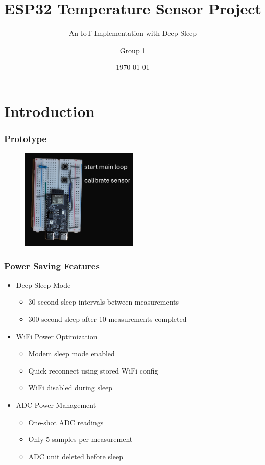 \documentclass[11pt,t,usepdftitle=false,aspectratio=169]{beamer}
\title[Temperature Sensor]{ESP32 Temperature Sensor Project}
\subtitle{An IoT Implementation with Deep Sleep}
\author{Group 1}
\date{\today}
\begin{document}
\section{Introduction}

\begin{frame}
\frametitle{Prototype}
  \begin{figure}
    \centering
    \includegraphics[width=0.5\textwidth]{_images/image_text.png}
  \end{figure}
\end{frame}


\begin{frame}
  \frametitle{Power Saving Features}
    \begin{itemize}
      \item Deep Sleep Mode
      \begin{itemize}
        \item 30 second sleep intervals between measurements
        \item 300 second sleep after 10 measurements completed
      \end{itemize}
      \item WiFi Power Optimization
      \begin{itemize}
        \item Modem sleep mode enabled
        \item Quick reconnect using stored WiFi config
        \item WiFi disabled during sleep
      \end{itemize}
      \item ADC Power Management
      \begin{itemize}
        \item One-shot ADC readings
        \item Only 5 samples per measurement
        \item ADC unit deleted before sleep
      \end{itemize}
    \end{itemize}
  \end{frame}
\end{document}
